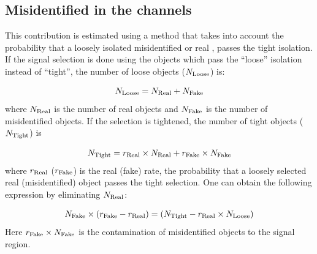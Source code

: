 \subsection{\texorpdfstring{Misidentified \Tau in the \leptonTau channels}{Misidentified tau in the lepton-tau channels}}
\label{sect:bkgFake}
This contribution is estimated using a method that takes into account the probability that a loosely isolated misidentified or real \Tau,
passes the tight isolation.
If the signal selection is done using the \Tau objects which pass the ``loose'' isolation instead of ``tight'', 
the number of loose \Tau objects ($N_{\rm Loose}$) is:

\begin{equation}
N_{\rm Loose} = N_{\rm Real} + N_{\rm Fake}
\end{equation}
where $N_{\rm Real}$ is the number of real \Tau objects and $N_{\rm Fake}$ is the number of misidentified 
\Tau objects. If the selection is tightened, the number of tight \Tau objects ($N_{\rm Tight}$)  is

\begin{equation}
 N_{\rm Tight} = r_{\rm Real}\times N_{\rm Real} + r_{\rm Fake}\times N_{\rm Fake}
\end{equation} 
where $r_{\rm Real}$ ($r_{\rm Fake}$) is the real (fake) rate, the probability that a loosely selected real (misidentified) \Tau object passes the  tight  selection. 
One can obtain the following expression by eliminating $N_{\rm Real}$:

\begin{equation}
   N_{\rm Fake}\times (r_{\rm Fake}-r_{\rm Real}) = (N_{\rm Tight} - r_{\rm Real}\times N_{\rm Loose})
\end{equation}
Here $r_{\rm Fake}\times N_{\rm Fake}$ is the contamination of misidentified \Tau objects to the signal region. 


